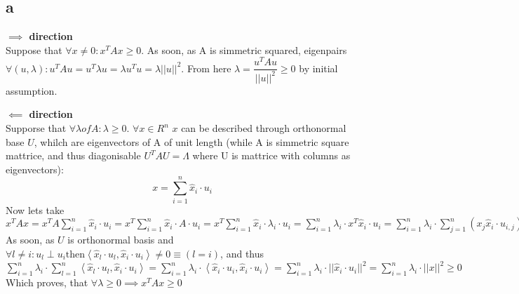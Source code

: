 \subsection*{a}
\textbf{$\implies$ direction}\\
Suppose that $\forall x \neq 0: x^T A x\geq 0$. As soon, as A is simmetric squared, 
eigenpairs $\forall (u,\lambda) : u^T A u = u^T \lambda u = \lambda u^Tu = \lambda ||u||^2$.
From here $\lambda = \dfrac{u^T A u}{||u||^2} \geq 0$ by initial assumption.

\textbf{$\impliedby$ direction}\\
Supporse that $\forall \lambda of A: \lambda \geq 0$.
$\forall x \in R^n$ $x$ can be described through orthonormal base $U$, whilch are eigenvectors
of A of unit length (while A is simmetric square mattrice, and thus diagonisable $U^TAU = \Lambda$
where U is mattrice with columns as eigenvectors):
\begin{equation}
	x = \sum_{i=1}^n{\hat{x}_i \cdot u_i}
\end{equation}
Now lets take $x^T A x = x^T A \sum_{i=1}^n{\hat{x}_i \cdot u_i} = 
	x^T \sum_{i=1}^n{\hat{x}_i \cdot A\cdot u_i} = x^T \sum_{i=1}^n{\hat{x}_i \cdot \lambda_i\cdot u_i}=
	\sum_{i=1}^n{\lambda_i\cdot x^T \hat{x}_i \cdot  u_i} = 
	\sum_{i=1}^n\lambda_i\cdot \sum_{j=1}^n (x_j \hat{x}_i \cdot  u_{i,j})=
	\sum_{i=1}^n{\lambda_i\cdot \sum_{j=1}^n (\sum_{l=1}^n(\hat{x}_l\cdot u_{l,j}) \cdot \hat{x}_i \cdot  u_{i,j}})=
	\sum_{i=1}^n{\lambda_i\cdot \sum_{j=1, l=1}^n \hat{x}_l\cdot u_{l,j} \cdot \hat{x}_i \cdot  u_{i,j}} =
	\sum_{i=1}^n{\lambda_i\cdot \sum_{l=1}^n \left<\hat{x}_l\cdot u_l ,\hat{x}_i \cdot  u_i\right>}$
As soon, as $U$ is orthonormal basis and $\forall l \neq i: u_l \perp u_i 
\text{then}  \left<\hat{x}_l\cdot u_l ,\hat{x}_i \cdot  u_i\right> \neq 0 \equiv (l = i)$, 
and thus $\sum_{i=1}^n{\lambda_i\cdot \sum_{l=1}^n \left<\hat{x}_l\cdot u_l ,\hat{x}_i \cdot  u_i\right>} =
			\sum_{i=1}^n{\lambda_i\cdot \left<\hat{x}_i\cdot u_i ,\hat{x}_i \cdot  u_i\right>}=
			\sum_{i=1}^n\lambda_i\cdot ||\hat{x}_i \cdot u_i||^2 =
			\sum_{i=1}^n\lambda_i\cdot ||x||^2 \geq 0$
Which proves, that $\forall \lambda \geq 0 \implies x^TAx \geq 0 $